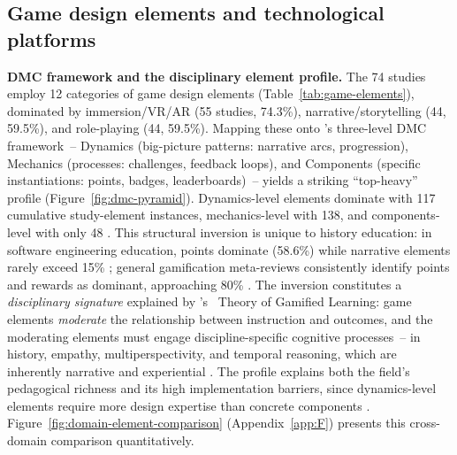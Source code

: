

\subsection{Game design elements and technological platforms} \label{sec:game-elements}

\textbf{DMC framework and the disciplinary element profile.} \label{sec:dmc-mapping} The 74 studies employ 12 categories of game design elements (Table~\ref{tab:game-elements}), dominated by immersion/VR/AR (55 studies, 74.3\%), narrative/storytelling (44, 59.5\%), and role-playing (44, 59.5\%). Mapping these onto \citeauthor{Werbach2012}'s \cite{Werbach2012} three-level DMC framework~-- Dynamics (big-picture patterns: narrative arcs, progression), Mechanics (processes: challenges, feedback loops), and Components (specific instantiations: points, badges, leaderboards)~-- yields a striking ``top-heavy'' profile (Figure~\ref{fig:dmc-pyramid}). Dynamics-level elements dominate with 117 cumulative study-element instances, mechanics-level with 138, and components-level with only 48 \cite{KorniienkoSemerikov2024}. This structural inversion is unique to history education: in software engineering education, points dominate (58.6\%) while narrative elements rarely exceed 15\% \cite{Korniienko2025aredu}; general gamification meta-reviews consistently identify points and rewards as dominant, approaching 80\% \cite{Hamari2014, SEABORN201514, Souza2018201}. The inversion constitutes a \textit{disciplinary signature} explained by \citeauthor{Landers2014}'s~\cite{Landers2014} Theory of Gamified Learning: game elements \textit{moderate} the relationship between instruction and outcomes, and the moderating elements must engage discipline-specific cognitive processes~-- in history, empathy, multiperspectivity, and temporal reasoning, which are inherently narrative and experiential \cite{MonteSano2012, Reisman2012, Hong2024}. The profile explains both the field's pedagogical richness and its high implementation barriers, since dynamics-level elements require more design expertise than concrete components \cite{Werbach2012, Toda2019}. Figure~\ref{fig:domain-element-comparison} (Appendix~\ref{app:F}) presents this cross-domain comparison quantitatively.

